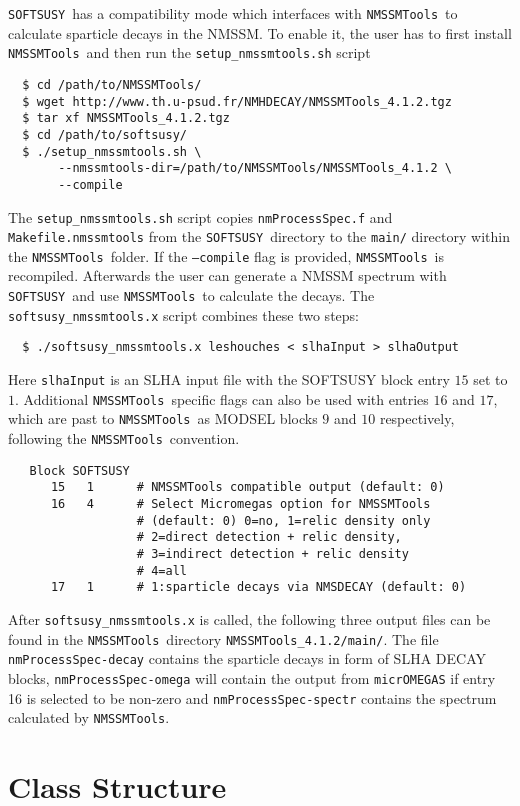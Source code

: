 \documentclass[final,3p,times,pdflatex]{elsarticle}
\def\SOFTSUSY{{\tt SOFTSUSY}}
\def\NMSSMTools{{\tt NMSSMTools}}
\def\code#1{\small{\tt #1}\normalsize}
\begin{document}
\SOFTSUSY\ has a compatibility mode which interfaces with \NMSSMTools\
to calculate sparticle decays in the NMSSM.  To enable it, the
user has to first install \NMSSMTools\ and then run the
\code{setup\_nmssmtools.sh} script
%
\begin{verbatim}
  $ cd /path/to/NMSSMTools/
  $ wget http://www.th.u-psud.fr/NMHDECAY/NMSSMTools_4.1.2.tgz
  $ tar xf NMSSMTools_4.1.2.tgz
  $ cd /path/to/softsusy/
  $ ./setup_nmssmtools.sh \
       --nmssmtools-dir=/path/to/NMSSMTools/NMSSMTools_4.1.2 \
       --compile
\end{verbatim}
%
The \code{setup\_nmssmtools.sh} script copies \code{nmProcessSpec.f}
and \code{Makefile.nmssmtools} from the \SOFTSUSY\ directory to the
{\tt main/} directory within the \NMSSMTools\ folder.  If the \code{--compile}
flag is provided, \NMSSMTools\ is recompiled.  Afterwards the user can
generate a NMSSM spectrum with \SOFTSUSY\ and use \NMSSMTools\ to
calculate the decays.  The \code{softsusy\_nmssmtools.x} script combines
these two steps:
%
\begin{verbatim}
  $ ./softsusy_nmssmtools.x leshouches < slhaInput > slhaOutput
\end{verbatim}
%
Here \code{slhaInput} is an SLHA input file with the SOFTSUSY block
entry $15$ set to $1$.  Additional \NMSSMTools\ specific flags can also
be used with entries $16$ and $17$, which are past to \NMSSMTools\ as
MODSEL blocks $9$ and $10$ respectively, following the \NMSSMTools\
convention.
%
\begin{verbatim}
   Block SOFTSUSY
      15   1      # NMSSMTools compatible output (default: 0) 
      16   4      # Select Micromegas option for NMSSMTools
                  # (default: 0) 0=no, 1=relic density only
                  # 2=direct detection + relic density, 
                  # 3=indirect detection + relic density
                  # 4=all  
      17   1      # 1:sparticle decays via NMSDECAY (default: 0)
\end{verbatim}
%
After \code{softsusy\_nmssmtools.x} is called, the following three output
files can be found in the \NMSSMTools\ directory
\code{NMSSMTools\_4.1.2/main/}. The file \code{nmProcessSpec-decay}
contains the sparticle decays in form of SLHA DECAY blocks,
\code{nmProcessSpec-omega} will contain the output from \code{micrOMEGAS} if entry 16 is selected to be non-zero and
\code{nmProcessSpec-spectr} contains the spectrum calculated by
\NMSSMTools.

\section{Class Structure\label{sec:objects}}
\end{document}
